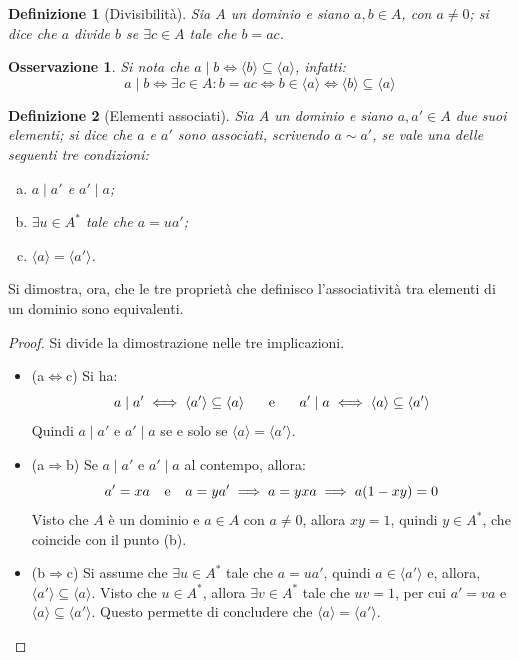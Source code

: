\documentclass[12pt]{scrartcl}
\theoremstyle{style}
\newtheorem{definizione}{Definizione}[section]
\newtheorem{osservazione}{Osservazione}[section]
\numberwithin{equation}{subsection}
\begin{document}
\begin{definizione}
	[Divisibilit\`a]
	Sia $A$ un dominio e siano $a,b \in A$, con $a\neq 0$; si dice che $a$ \textit{divide} $b$ se $\exists c \in A$ tale che $b=ac$.
\end{definizione}
\begin{osservazione}
Si nota che $a  \mid b \iff \langle b \rangle\subseteq \langle a \rangle$, infatti:
\[
a \mid b \iff\exists c \in A : b = ac \iff b \in \langle a \rangle \iff \langle b \rangle\subseteq \langle a \rangle
\] 
\end{osservazione}
\begin{definizione}
	[Elementi associati]
	Sia $A$ un dominio e siano $a, a' \in A$ due suoi elementi; si dice che $a$ e $a'$ sono \textit{associati}, scrivendo $a \sim a'$, se vale una delle seguenti tre condizioni:
	\begin{enumerate}[(a).]
		\item $a \mid a'$ e $a'  \mid a$;
		\item $\exists u \in A^*$ tale che $ a= ua'$;
		\item $\langle a \rangle=\langle a' \rangle$.
	\end{enumerate}
\end{definizione}
\noindent Si dimostra, ora, che le tre propriet\`a che definisco l'associativit\`a tra elementi di un dominio sono equivalenti.
\begin{proof}
	Si divide la dimostrazione nelle tre implicazioni.
	\begin{itemize}
		\item (a$\Leftrightarrow$c) Si ha:
			\[
			a  \mid a' \iff \langle a' \rangle\subseteq \langle a \rangle \hspace{.5cm}  \text{ e } \hspace{.5cm} a' \mid a \iff\langle a \rangle\subseteq \langle a' \rangle
			\] 
			Quindi $a \mid a'$ e $a' \mid a$ se e solo se $\langle a \rangle=\langle a' \rangle$.
		\item (a$\Rightarrow $b) Se $a  \mid a'$ e $a'  \mid a$ al contempo, allora:
			\[
			a'=xa \hspace{.25cm} \text{ e } \hspace{.25cm} a = y a' \implies a = yxa \implies a (1-xy) = 0
			\] 
			Visto che $A$ \`e un dominio e $a\in A$ con $a\neq 0$, allora $xy=  1$, quindi $y \in A^*$, che coincide con il punto (b).
		\item (b$\Rightarrow $c) Si assume che $\exists u \in A^* $ tale che $ a=ua'$, quindi $a \in \langle a' \rangle$ e, allora, $\langle a' \rangle\subseteq \langle a \rangle$.
			Visto che $u\in A^*$, allora $\exists v \in A^*$ tale che $uv=  1$, per cui $a'= va$ e $\langle a \rangle\subseteq \langle a' \rangle$.
			Questo permette di concludere che $\langle a \rangle=\langle a' \rangle$.
	\end{itemize}
\end{proof}
\end{document}
